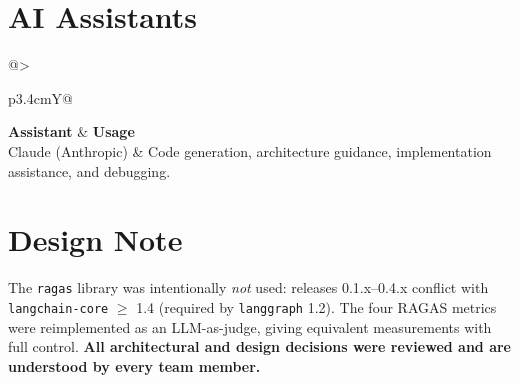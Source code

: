 \documentclass[10pt,a4paper]{article}
\newcommand{\code}[1]{\texttt{#1}}
\begin{document}
\section{AI Assistants}
\small
\begin{tabularx}{\textwidth}{@{}>{\raggedright\arraybackslash}p{3.4cm}Y@{}}
\toprule
\textbf{Assistant} & \textbf{Usage} \\
\midrule
Claude (Anthropic) & Code generation, architecture guidance, implementation assistance, and debugging. \\
\bottomrule
\end{tabularx}
\normalsize

\section{Design Note}
The \code{ragas} library was intentionally \emph{not} used: releases 0.1.x--0.4.x conflict with
\code{langchain-core} $\geq$ 1.4 (required by \code{langgraph} 1.2). The four RAGAS metrics were
reimplemented as an LLM-as-judge, giving equivalent measurements with full control. \textbf{All
architectural and design decisions were reviewed and are understood by every team member.}
\end{document}
